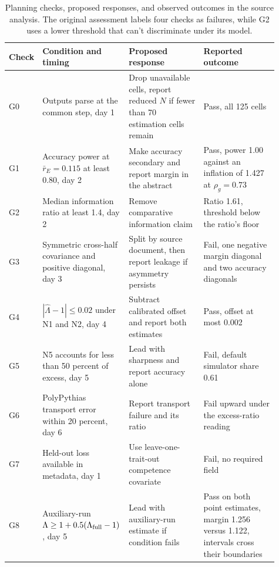 \begin{table}[!htb]
\centering
\caption{Planning checks, proposed responses, and observed outcomes in the source analysis. The original assessment labels four checks as failures, while G2 uses a lower threshold that can't discriminate under its model.}
\label{tab:original5}
\small\setlength{\tabcolsep}{4pt}\renewcommand{\arraystretch}{1.12}
\begin{tabular}{L{0.07\linewidth}L{0.28\linewidth}L{0.28\linewidth}L{0.28\linewidth}}\toprule
Check & Condition and timing & Proposed response & Reported outcome\\\midrule
G0 & Outputs parse at the common step, day 1 & Drop unavailable cells, report reduced $N$ if fewer than 70 estimation cells remain & Pass, all 125 cells\\
G1 & Accuracy power at $\bar r_E=0.115$ at least 0.80, day 2 & Make accuracy secondary and report margin in the abstract & Pass, power 1.00 against an inflation of 1.427 at $\rho_g=0.73$\\
G2 & Median information ratio at least 1.4, day 2 & Remove comparative information claim & Ratio 1.61, threshold below the ratio's floor\\
G3 & Symmetric cross-half covariance and positive diagonal, day 3 & Split by source document, then report leakage if asymmetry persists & Fail, one negative margin diagonal and two accuracy diagonals\\
G4 & $|\widehat\Lambda-1|\leq0.02$ under N1 and N2, day 4 & Subtract calibrated offset and report both estimates & Pass, offset at most 0.002\\
G5 & N5 accounts for less than 50 percent of excess, day 5 & Lead with sharpness and report accuracy alone & Fail, default simulator share 0.61\\
G6 & PolyPythias transport error within 20 percent, day 6 & Report transport failure and its ratio & Fail upward under the excess-ratio reading\\
G7 & Held-out loss available in metadata, day 1 & Use leave-one-trait-out competence covariate & Fail, no required field\\
G8 & Auxiliary-run $\Lambda\geq1+0.5(\Lambda_{\rm full}-1)$, day 5 & Lead with auxiliary-run estimate if condition fails & Pass on both point estimates, margin 1.256 versus 1.122, intervals cross their boundaries\\\bottomrule
\end{tabular}
\end{table}

